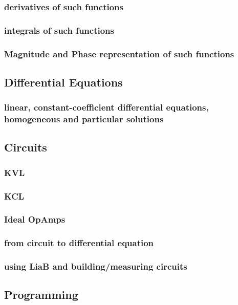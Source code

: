 \documentclass{article}
\begin{document}
\subsubsection{derivatives of such functions}
\label{sec:orgd683c17}
\subsubsection{integrals of such functions}
\label{sec:orgb886643}
\subsubsection{Magnitude and Phase representation of such functions}
\label{sec:orgb95111f}
\subsection{Differential Equations}
\label{sec:org120d93e}
\subsubsection{linear, constant-coefficient differential equations, homogeneous and particular solutions}
\label{sec:orge383fad}
\subsection{Circuits}
\label{sec:org31004e2}
\subsubsection{KVL}
\label{sec:org9564d33}
\subsubsection{KCL}
\label{sec:org40e88b2}
\subsubsection{Ideal OpAmps}
\label{sec:org6e9cfb7}
\subsubsection{from circuit to differential equation}
\label{sec:org524b0c2}
\subsubsection{using LiaB and building/measuring circuits}
\label{sec:orgcaff05e}
\subsection{Programming}
\label{sec:org132ba3d}
\end{document}
